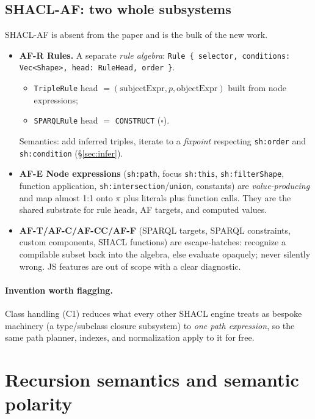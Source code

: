 \documentclass[11pt]{article}
\newcommand{\code}[1]{\texttt{#1}}
\theoremstyle{definition}
\begin{document}
\subsection{SHACL-AF: two whole subsystems}
SHACL-AF is absent from the paper and is the bulk of the new work.
\begin{itemize}[leftmargin=1.4em]
  \item \textbf{AF-R Rules.} A separate \emph{rule algebra}:
  \code{Rule \{ selector, conditions: Vec<Shape>, head: RuleHead, order \}}.
  \begin{itemize}
    \item \code{TripleRule} head $=(\text{subjectExpr},p,\text{objectExpr})$ built
    from node expressions;
    \item \code{SPARQLRule} head $=$ \code{CONSTRUCT} ($\square$).
  \end{itemize}
  Semantics: add inferred triples, iterate to a \emph{fixpoint} respecting
  \code{sh:order} and \code{sh:condition} (\S\ref{sec:infer}).
  \item \textbf{AF-E Node expressions} (\code{sh:path}, focus \code{sh:this},
  \code{sh:filterShape}, function application, \code{sh:intersection}/\code{union},
  constants) are \emph{value-producing} and map almost 1:1 onto $\pi$ plus
  literals plus function calls. They are the shared substrate for rule heads, AF
  targets, and computed values.
  \item \textbf{AF-T/AF-C/AF-CC/AF-F} (SPARQL targets, SPARQL constraints, custom
  components, SHACL functions) are escape-hatches: recognize a compilable subset
  back into the algebra, else evaluate opaquely; never silently wrong. JS
  features are out of scope with a clear diagnostic.
\end{itemize}

\paragraph{Invention worth flagging.} Class handling (C1) reduces what every
other SHACL engine treats as bespoke machinery (a type/subclass closure
subsystem) to \emph{one path expression}, so the same path planner, indexes, and
normalization apply to it for free.

\section{Recursion semantics and semantic polarity}\label{sec:recursion}
\end{document}
